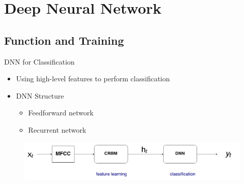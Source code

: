 % 	    
% 
% 
% 
% 
%   

\section{Deep Neural Network}%
	\subsection{Function and Training}	
	\begin{frame}[t]{DNN for Classification}
	      \begin{itemize}
		\itemsep10pt
		\item Using high-level features to perform classification
		\item DNN Structure
		      \begin{itemize}
			    \item Feedforward network
			    \item Recurrent network
		      \end{itemize}  
	      \end{itemize}
	 \begin{figure}
	      \includegraphics[width=\linewidth]{Framework2.png}
	 \end{figure}
	\end{frame}

